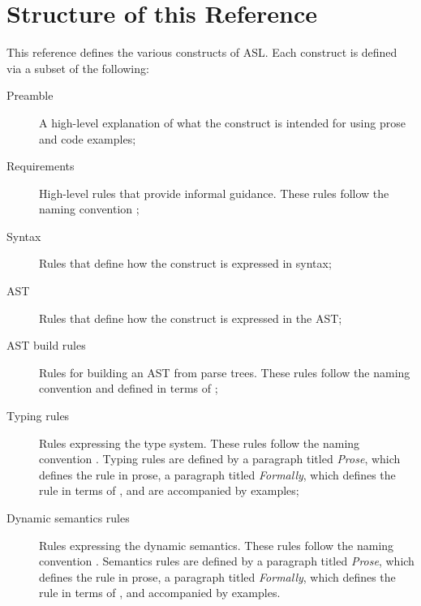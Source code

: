 
\section{Structure of this Reference}
This reference defines the various constructs of ASL.
Each construct is defined via a subset of the following:
\begin{description}
    \item[Preamble] A high-level explanation of what the construct is intended for using
        prose and code examples;
    \item[Requirements] High-level rules that provide informal guidance.
        These rules follow the naming convention ;
    \item[Syntax] Rules that define how the construct is expressed in syntax;
    \item[AST] Rules that define how the construct is expressed in the AST;
    \item[AST build rules] Rules for building an AST from parse trees.
        These rules follow the naming convention 
        and defined in terms of \inferencerules;
    \item[Typing rules] Rules expressing the type system.
        These rules follow the naming convention .
        Typing rules are defined by a paragraph titled \emph{Prose},
        which defines the rule in prose,
        a paragraph titled \emph{Formally}, which defines the rule in terms of \inferencerules,
        and are accompanied by examples;
    \item[Dynamic semantics rules] Rules expressing the dynamic semantics.
        These rules follow the naming convention .
        Semantics rules are defined by a paragraph titled \emph{Prose},
        which defines the rule in prose,
        a paragraph titled \emph{Formally}, which defines the rule in terms of \inferencerules,
        and accompanied by examples.
\end{description}

